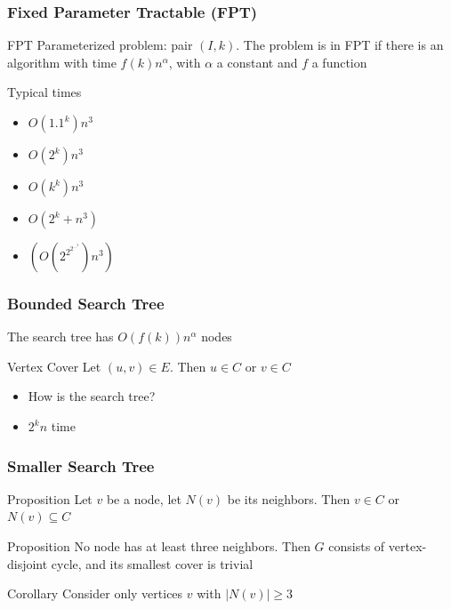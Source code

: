 \documentclass[12pt,aspectratio=169]{beamer}
\begin{document}
\begin{frame}\frametitle{Fixed Parameter Tractable (FPT) }
  \begin{block}{FPT}
    Parameterized problem: pair $(I,k)$.
%
    The problem is in FPT if there is an algorithm with time $f(k)n^{\alpha}$, with
    $\alpha$ a constant and $f$ a function
  \end{block}

  \begin{block}{Typical times}
    \begin{itemize}
    \item
      $O(1.1^{k})n^{3}$
    \item
      $O(2^{k})n^{3}$
    \item
      $O(k^{k})n^{3}$
    \item
      $O(2^{k} + n^{3})$
    \item
      $(O(2^{2^{2^{...^{2}}}})n^{3})$
    \end{itemize}
  \end{block}
\end{frame} 

\begin{frame}\frametitle{Bounded Search Tree }
  The search tree has $O(f(k))n^{\alpha}$ nodes

  \begin{block}{Vertex Cover}
    Let $(u,v)\in E$.
%
    Then $u\in C$ or $v\in C$
  \end{block}

  \begin{itemize}
  \item
    How is the search tree?
  \item
    $2^{k}n$ time
  \end{itemize}
\end{frame} 

\begin{frame}\frametitle{Smaller Search Tree }
    \begin{block}{Proposition}
      Let $v$ be a node, let $N(v)$ be its neighbors.
%
      Then $v\in C$ or $N(v)\subseteq C$
    \end{block}
    \begin{block}{Proposition}
      No node has at least three neighbors.
%
      Then $G$ consists of vertex-disjoint cycle, and its smallest cover is trivial
    \end{block}

    \begin{block}{Corollary}
      Consider only vertices $v$ with $|N(v)|\ge 3$
    \end{block}
  \end{frame}
\end{document}

